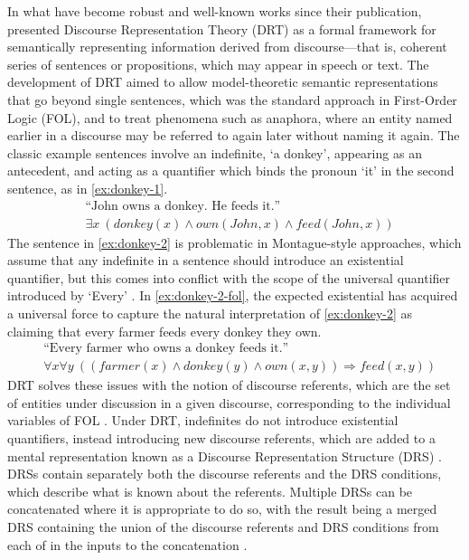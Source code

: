 \documentclass[a4paper,12pt,leqno,twoside]{article}
\begin{document}
In what have become robust and well-known works since their publication, \citet{kamp1981theory,kamp1988discourse,Kamp1993} presented Discourse Representation Theory (DRT) as a formal framework for semantically representing information derived from discourse---that is, coherent series of sentences or propositions, which may appear in speech or text. The development of DRT aimed to allow model-theoretic semantic representations that go beyond single sentences, which was the standard approach in First-Order Logic (FOL), and to treat phenomena such as anaphora, where an entity named earlier in a discourse may be referred to again later without naming it again. The classic example sentences \citep{kamp1988discourse} involve an indefinite, `a donkey', appearing as an antecedent, and acting as a quantifier which binds the pronoun `it' in the second sentence, as in \cref{ex:donkey-1}.
\begin{subequations}
	\begin{align}
		&\text{``John owns a donkey. He feeds it.''}\label{ex:donkey-1}\\
		&\exists x ~(donkey(x) \land own(John, x) \land feed(John, x))\label{ex:donkey-1-fol}
	\end{align}
\end{subequations}
The sentence in \cref{ex:donkey-2} is problematic in Montague-style approaches, which assume that any indefinite in a sentence should introduce an existential quantifier, but this comes into conflict with the scope of the universal quantifier introduced by `Every' \citep[p, 91]{kamp1988discourse}. In \cref{ex:donkey-2-fol}, the expected existential has acquired a universal force to capture the natural interpretation of \cref{ex:donkey-2} as claiming that every farmer feeds every donkey they own.
\begin{subequations}
	\begin{align}
		&\text{``Every farmer who owns a donkey feeds it.''}\label{ex:donkey-2}\\
		&\forall x \forall y ~((farmer(x) \land donkey(y) \land own(x,y)) \Longrightarrow feed(x,y))\label{ex:donkey-2-fol}
	\end{align}
\end{subequations}
DRT solves these issues with the notion of discourse referents, which are the set of entities under discussion in a given discourse, corresponding to the individual variables of FOL \citep[p. 397]{Bird2009}. Under DRT, indefinites do not introduce existential quantifiers, instead introducing new discourse referents, which are added to a mental representation known as a Discourse Representation Structure (DRS) \citep{geurts2007discourse}. DRSs contain separately both the discourse referents and the DRS conditions, which describe what is known about the referents. Multiple DRSs can be concatenated where it is appropriate to do so, with the result being a merged DRS containing the union of the discourse referents and DRS conditions from each of in the inputs to the concatenation \citep[p. 399]{Bird2009}.
\end{document}
